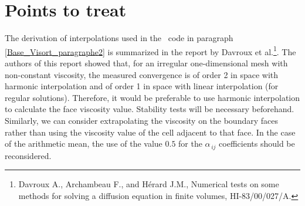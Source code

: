 \section*{Points to treat}

The derivation of interpolations used in the \CS\ code in paragraph
\ref{Base_Visort_paragraphe2} is summarized in the report by Davroux et al.\footnote{Davroux A., Archambeau F., and Hérard J.M., Numerical tests on some methods for solving a diffusion equation in finite volumes,
HI-83/00/027/A.}. The authors of this report showed that, for an irregular one-dimensional mesh with non-constant viscosity, the measured convergence is of order 2 in space with harmonic interpolation and of order 1 in space with linear interpolation (for regular solutions). Therefore, it would be preferable to use harmonic interpolation to calculate the face viscosity value. Stability tests will be necessary beforehand.
Similarly, we can consider extrapolating the viscosity on the boundary faces rather than
using the viscosity value of the cell adjacent to that face.
In the case of the arithmetic mean, the use of the value $0.5$ for the $\alpha_{\,ij}$ coefficients should be reconsidered.

